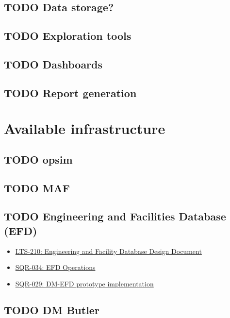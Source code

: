\subsection{{\bfseries\sffamily TODO} Data storage?}
\label{sec:org0e4e03b}
\subsection{{\bfseries\sffamily TODO} Exploration tools}
\label{sec:org6710af1}
\subsection{{\bfseries\sffamily TODO} Dashboards}
\label{sec:orgea9f1ad}
\subsection{{\bfseries\sffamily TODO} Report generation}
\label{sec:orgb37bc47}
\section{Available infrastructure}
\label{sec:org9e1a54f}
\subsection{{\bfseries\sffamily TODO} opsim}
\label{sec:org150783d}
\subsection{{\bfseries\sffamily TODO} MAF}
\label{sec:org9d1f7b2}
\subsection{{\bfseries\sffamily TODO} Engineering and Facilities Database (EFD)}
\label{sec:orga47ff69}
\begin{itemize}
\item \href{https://ls.st/LTS-210}{LTS-210: Engineering and Facility Database Design Document}
\item \href{https://sqr-034.lsst.io/}{SQR-034: EFD Operations}
\item \href{https://sqr-029.lsst.io/}{SQR-029: DM-EFD prototype implementation}
\end{itemize}
\subsection{{\bfseries\sffamily TODO} DM Butler}
\label{sec:orgd9890c1}
